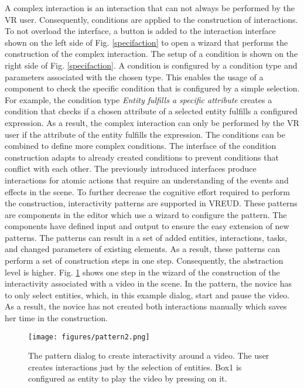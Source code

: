 \documentclass[conference]{IEEEtran}
\begin{document}
A complex interaction is an interaction that can not always be performed by the \ac{VR} user. Consequently, conditions are applied to the construction of interactions. To not overload the interface, a button is added to the interaction interface shown on the left side of Fig. \ref{specifaction} to open a wizard that performs the construction of the complex interaction. The setup of a condition is shown on the right side of Fig. \ref{specifaction}. A condition is configured by a condition type and parameters associated with the chosen type. This enables the usage of a component to check the specific condition that is configured by a simple selection. For example, the condition type \textit{Entity fulfills a specific attribute} creates a condition that checks if a chosen attribute of a selected entity fulfills a configured expression. As a result, the complex interaction can only be performed by the \ac{VR} user if the attribute of the entity fulfills the expression. The conditions can be combined to define more complex conditions. The interface of the condition construction adapts to already created conditions to prevent conditions that conflict with each other. The previously introduced interfaces produce interactions for atomic actions that require an understanding of the events and effects in the scene. To further decrease the cognitive effort required to perform the construction, interactivity patterns are supported in VREUD. These patterns are components in the editor which use a wizard to configure the pattern. The components have defined input and output to ensure the easy extension of new patterns. The patterns can result in a set of added entities, interactions, tasks, and changed parameters of existing elements. As a result, these patterns can perform a set of construction steps in one step. Consequently, the abstraction level is higher. Fig. \ref{patternDialog} shows one step in the wizard of the construction of the interactivity associated with a video in the scene. In the pattern, the novice has to only select entities, which, in this example dialog, start and pause the video. As a result, the novice has not created both interactions manually which saves her time in the construction.

    \begin{figure}[htbp]
\centerline{\texttt{[image: figures/pattern2.png]}}
\caption{The pattern dialog to create interactivity around a video. The user creates interactions just by the selection of entities. Box1 is configured as entity to play the video by pressing on it.}
\label{patternDialog}
\end{figure}
\end{document}
